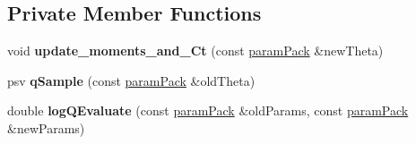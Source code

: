 \subsection*{Private Member Functions}
\begin{DoxyCompactItemize}
\item 
\mbox{\label{classada__pmmh__mvn_a29c1675361d7f9da31365f3939efe630}} 
void {\bfseries update\+\_\+moments\+\_\+and\+\_\+\+Ct} (const \hyperlink{classparamPack}{param\+Pack} \&new\+Theta)
\item 
\mbox{\label{classada__pmmh__mvn_aa98a7a7f2b7e1b3a56f68334a1d1f8f5}} 
psv {\bfseries q\+Sample} (const \hyperlink{classparamPack}{param\+Pack} \&old\+Theta)
\item 
\mbox{\label{classada__pmmh__mvn_ac4c5909e3f7b1ce098c04e53f5f1b58d}} 
double {\bfseries log\+Q\+Evaluate} (const \hyperlink{classparamPack}{param\+Pack} \&old\+Params, const \hyperlink{classparamPack}{param\+Pack} \&new\+Params)
\end{DoxyCompactItemize}
